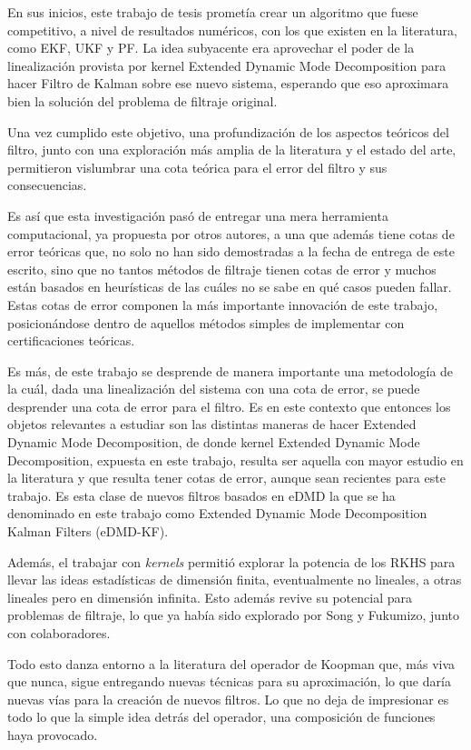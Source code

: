 En sus inicios, este trabajo de tesis prometía crear un algoritmo que fuese competitivo, a nivel de resultados numéricos, con los que existen en la literatura, como EKF, UKF y PF. La idea subyacente era aprovechar el poder de la linealización provista por kernel Extended Dynamic Mode Decomposition para hacer Filtro de Kalman sobre ese nuevo sistema, esperando que eso aproximara bien la solución del problema de filtraje original.

Una vez cumplido este objetivo, una profundización de los aspectos teóricos del filtro, junto con una exploración más amplia de la literatura y el estado del arte, permitieron vislumbrar una cota teórica para el error del filtro y sus consecuencias.

Es así que esta investigación pasó de entregar una mera herramienta computacional, ya propuesta por otros autores, a una que además tiene cotas de error teóricas que, no solo no han sido demostradas a la fecha de entrega de este escrito, sino que no tantos métodos de filtraje tienen cotas de error y muchos están basados en heurísticas de las cuáles no se sabe en qué casos pueden fallar. Estas cotas de error componen la más importante innovación de este trabajo, posicionándose dentro de aquellos métodos simples de implementar con certificaciones teóricas.

Es más, de este trabajo se desprende de manera importante una metodología de la cuál, dada una linealización del sistema con una cota de error, se puede desprender una cota de error para el filtro. Es en este contexto que entonces los objetos relevantes a estudiar son las distintas maneras de hacer Extended Dynamic Mode Decomposition, de donde kernel Extended Dynamic Mode Decomposition, expuesta en este trabajo, resulta ser aquella con mayor estudio en la literatura y que resulta tener cotas de error, aunque sean recientes para este trabajo. Es esta clase de nuevos filtros basados en eDMD la que se ha denominado en este trabajo como Extended Dynamic Mode Decomposition Kalman Filters (eDMD-KF).

Además, el trabajar con \textit{kernels} permitió explorar la potencia de los RKHS para llevar las ideas estadísticas de dimensión finita, eventualmente no lineales, a otras lineales pero en dimensión infinita. Esto además revive su potencial para problemas de filtraje, lo que ya había sido explorado por Song y Fukumizo, junto con colaboradores.

Todo esto danza entorno a la literatura del operador de Koopman que, más viva que nunca, sigue entregando nuevas técnicas para su aproximación, lo que daría nuevas vías para la creación de nuevos filtros. Lo que no deja de impresionar es todo lo que la simple idea detrás del operador, una composición de funciones haya provocado.

